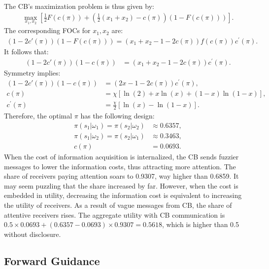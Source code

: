 \documentclass[12pt,a4paper]{article}
\begin{document}
The CB's maximization problem is thus given by:
\begin{align}
    \max_{x_1,x_2} \left[\frac{1}{2}F(c(\pi)) + \left(\frac{1}{2}(x_1+x_2)-c(\pi)\right)(1-F(c(\pi)))\right].
\end{align}
The corresponding FOCs for $x_1,x_2$ are:
\begin{align}
    (1-2c'(\pi))(1-F(c(\pi)))=(x_1+x_2-1-2c(\pi))f(c(\pi))c^\prime(\pi).
\end{align}
It follows that:
\begin{align}
    (1-2c'(\pi))(1-c(\pi)) & = (x_1+x_2-1-2c(\pi))c^\prime(\pi).
\end{align}
Symmetry implies:
\begin{align}
    (1-2c'(\pi))(1-c(\pi)) & = (2x-1-2c(\pi))c^\prime(\pi), \\
    c(\pi) & = \chi[\ln(2)+x\ln(x)+(1-x)\ln(1-x)], \\
    c^\prime(\pi) & = \frac{\chi}{2}[\ln(x)-\ln(1-x)].
\end{align}
Therefore, the optimal $\pi$ has the following design:
\begin{align}
    \pi(s_1|\omega_1) = \pi(s_2|\omega_2) & \approx 0.6357, \\
    \pi(s_1|\omega_2) = \pi(s_2|\omega_1) & \approx 0.3463, \\
    c(\pi) & = 0.0693.
\end{align}
When the cost of information acquisition is internalized, the CB sends fuzzier messages to lower the information costs, thus attracting more attention. The share of receivers paying attention soars to 0.9307, way higher than 0.6859. It may seem puzzling that the share increased by far. However, when the cost is embedded in utility, decreasing the information cost is equivalent to increasing the utility of receivers. As a result of vague messages from CB, the share of attentive receivers rises. The aggregate utility with CB communication is $0.5 \times 0.0693 + (0.6357-0.0693) \times  0.9307 = 0.5618$, which is higher than 0.5 without disclosure. 

\subsection{Forward Guidance}
\end{document}
